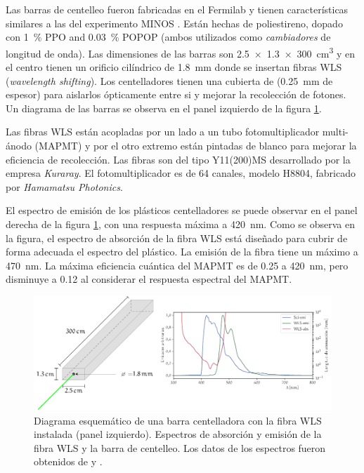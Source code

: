 Las barras de centelleo fueron fabricadas en el Fermilab y tienen características similares a las del experimento MINOS \cite{knitta04}. Están hechas de poliestireno, dopado con \SI{1}{\percent} PPO and \SI{0.03}{\percent} POPOP (ambos utilizados como \emph{cambiadores} de longitud de onda). Las dimensiones de las barras son \SI[product-units=power]{2.5x1.3x300}{\cubic\cm} y en el centro tienen un orificio cilíndrico de \SI{1.8}{\mm} donde se insertan fibras WLS (\emph{wavelength shifting}). Los centelladores tienen una cubierta de  (\SI{0.25}{\mm} de espesor) para aislarlos ópticamente entre si y mejorar la recolección de fotones. Un diagrama de las barras se observa en el panel izquierdo de la figura \ref{fig:scibar-optics}.

Las fibras WLS están acopladas por un lado a un tubo fotomultiplicador multi-ánodo (MAPMT) y por el otro extremo están pintadas de blanco para mejorar la eficiencia de recolección. Las fibras son del tipo Y11(200)MS desarrollado por la empresa \emph{Kuraray}. El fotomultiplicador es de \num{64} canales, modelo H8804, fabricado por \emph{Hamamatsu Photonics}.

El espectro de emisión de los plásticos centelladores se puede observar en el panel derecha de la figura \ref{fig:scibar-optics}, con una respuesta máxima a \SI{420}{\nano\metre}. Como se observa en la figura, el espectro de absorción de la fibra WLS está diseñado para cubrir de forma adecuada el espectro del plástico. La emisión de la fibra tiene un máximo a \SI{470}{\nano\metre}. La máxima eficiencia cuántica del MAPMT es de \num{0.25} a \SI{420}{\nano\metre}, pero disminuye a \num{0.12} al considerar el respuesta espectral del MAPMT.

\begin{figure}
        \centering
        \includegraphics[width=\textwidth]{scibar.pdf}
        \caption{Diagrama esquemático de una barra centelladora con la fibra WLS instalada (panel izquierdo). Espectros de absorción y emisión de la fibra WLS y la barra de centelleo. Los datos de los espectros fueron obtenidos de \cite{kikawa14} y \cite{dietz16}.}
        \label{fig:scibar-optics}
\end{figure}

